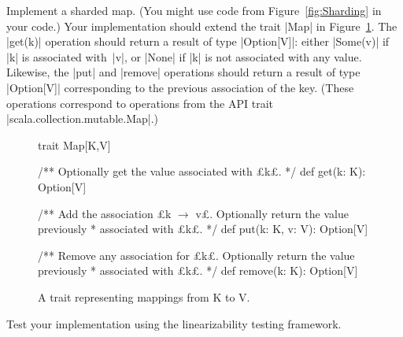 \begin{questionS}
\label{ex:sharded-map}
Implement a sharded map.  (You might use code from Figure~\ref{fig:Sharding}
in your code.)  Your implementation should extend the trait |Map| in
Figure~\ref{fig:Map-trait}.  The |get(k)| operation should return a result of
type |Option[V]|: either |Some(v)| if |k| is associated with~|v|, or |None| if
|k| is not associated with any value.  Likewise, the |put| and |remove|
operations should return a result of type |Option[V]| corresponding to the
previous association of the key.  (These operations correspond to operations
from the API trait |scala.collection.mutable.Map|.)


\begin{figure}
\begin{scala}
trait Map[K,V]{
  /** Optionally get the value associated with £k£. */
  def get(k: K): Option[V] 

  /** Add the association £k $\rightarrow$ v£.  Optionally return the value previously
    * associated with £k£. */
  def put(k: K, v: V): Option[V] 

  /** Remove any association for £k£.  Optionally return the value previously
    * associated with £k£. */
  def remove(k: K): Option[V] 
}
\end{scala}
\caption{A trait representing mappings from {\scalashape K} to {\scalashape
    V}.}
\label{fig:Map-trait}
\end{figure}


Test your implementation using the linearizability testing framework.
\end{questionS}


